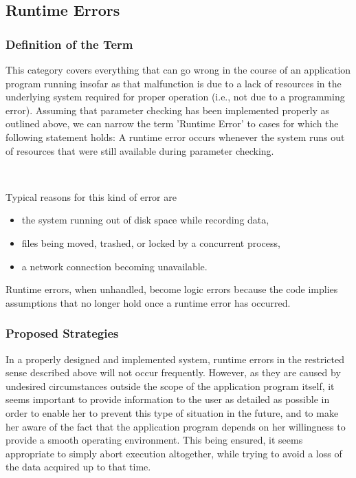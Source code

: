 \documentclass[12pt,a4paper]{article}
\begin{document}
\subsection{Runtime Errors}

\subsubsection{Definition of the Term}

This category covers everything that can go wrong
in the course of an application program running
insofar as that malfunction is due to a lack of resources in the
underlying system required for proper operation
(i.e., not due to a programming error).
Assuming that parameter checking has been implemented
properly as outlined above, we can narrow the term
'Runtime Error' to cases for which the following statement
holds: A runtime error occurs whenever the system runs
out of resources that were still available during parameter
checking.

\ 

Typical reasons for this kind of error are
\begin{itemize}
\item the system running out of disk space while recording data,
\item files being moved, trashed, or locked by a concurrent process,
\item a network connection becoming unavailable.
\end{itemize}

Runtime errors, when unhandled, become logic errors because
the code implies assumptions that no longer hold once a
runtime error has occurred.

\subsubsection{Proposed Strategies}

In a properly designed and implemented system, runtime errors
in the restricted sense described above will not occur 
frequently. However, as they are caused by undesired
circumstances outside the scope of the application program
itself, it seems important to provide information
to the user as detailed as possible in order to enable her
to prevent this type of situation in the future, and to 
make her aware of the fact that the application program
depends on her willingness to provide a smooth operating
environment. This being ensured, it seems appropriate to
simply abort execution altogether, while trying to avoid 
a loss of the data acquired up to that time.
\end{document}
